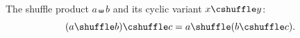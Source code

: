 \documentclass{article}
\begin{document}
The shuffle product $a \shuffle b$ and its cyclic variant $x \cshuffle y$:
\[ (a \shuffle b) \cshuffle c = a \shuffle (b \cshuffle c). \]
\end{document}
